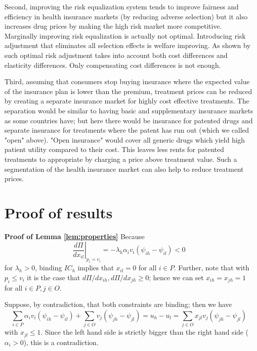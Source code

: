 \documentclass[12pt,english,a4paper]{article}
\begin{document}
Second, improving the risk equalization system tends to improve fairness and efficiency in health insurance markets (by reducing adverse selection) but it also increases drug prices by making the high risk market more competitive. Marginally improving risk equalization is actually not optimal. Introducing risk adjustment that eliminates all selection effects is welfare improving. As shown by \cite{bijlsma2014} such optimal risk adjustment takes into account both cost differences and elasticity differences. Only compensating cost differences is not enough.

Third, assuming that consumers stop buying insurance where the expected value of the insurance plan is lower than the premium, treatment prices can be reduced by creating a separate insurance market for highly cost effective treatments. The separation would be similar to having basic and supplementary insurance markets as some countries have; but here there would be insurance for patented drugs and separate insurance for treatments  where the patent has run out (which we called "open" above). "Open insurance" would cover all generic drugs which yield high patient utility compared to their cost. This leaves less rents for patented treatments to appropriate by charging a price above treatment value. Such a segmentation of the health insurance market can also help to reduce treatment prices.





\setcounter{table}{0}
\renewcommand{\thetable}{\thesection\arabic{table}}



\section{Proof of results}
\label{sec:orgc975e39}

\textbf{Proof of Lemma \ref{lem:properties}}
Because
\begin{equation}
\label{eq:16}
\left. \frac{d\Pi}{d x_{il}}\right|_{p_i=v_i} = - \lambda_h \alpha_i v_i (\psi_{ih}-\psi_{il}) < 0
\end{equation}
for \(\lambda_h >0\), binding \(IC_h\) implies that \(x_{il} =0\) for all \(i \in P\). Further, note that with \(p_i \leq v_i\) it is the case that \(d \Pi/d x_{ih}, d \Pi/d x_{jh} \geq 0\); hence we can set \(x_{ih} = x_{jh} =1\) for all \(i \in P, j \in O\).

Suppose, by contradiction, that both constraints are binding; then we have
\begin{equation}
\label{eq:17}
 \sum_{i \in P} \alpha_i v_i (\psi_{ih}-\psi_{il}) + \sum_{j \in O} v_j (\psi_{jh}-\psi_{jl})  = u_h - u_l = \sum_{j \in O} x_{jl} v_j (\psi_{jh}-\psi_{jl})
\end{equation}
with \(x_{jl} \leq 1\). Since the left hand side is strictly bigger than the right hand side (\(\alpha_i > 0\)), this is a contradiction.
\end{document}
